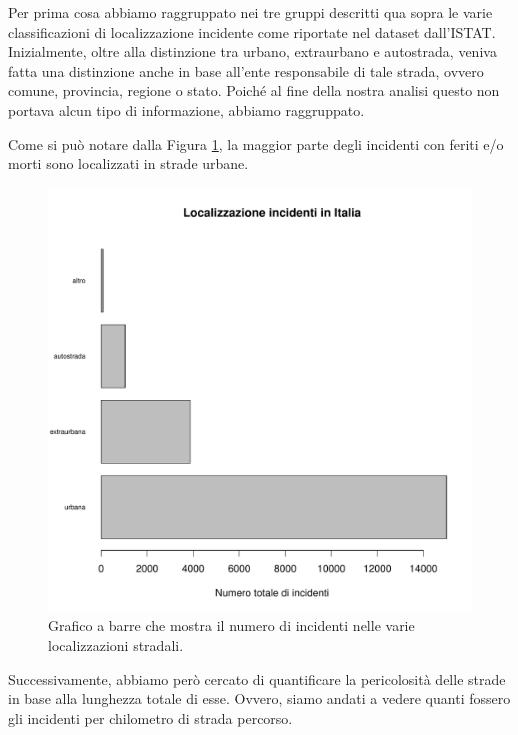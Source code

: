 \documentclass[12pt,a4paper,final,oneside]{article}			%
\begin{document}
        Per prima cosa abbiamo raggruppato nei tre gruppi descritti qua sopra le varie classificazioni di localizzazione incidente come riportate nel dataset dall'ISTAT.
        Inizialmente, oltre alla distinzione tra urbano, extraurbano e autostrada, veniva fatta una distinzione anche in base all'ente responsabile di tale strada, ovvero comune, provincia, regione o stato. Poiché al fine della nostra analisi questo non portava alcun tipo di informazione, abbiamo raggruppato.
        
        Come si può notare dalla Figura \ref{Fig: localizzazione_incidenti}, la maggior parte degli incidenti con feriti e/o morti sono localizzati in strade urbane.
        \begin{figure}[h]
            \centering
            \includegraphics[scale=0.55]{../results/localizzazione_incidenti.pdf}
            \caption{Grafico a barre che mostra il numero di incidenti nelle varie localizzazioni stradali. }
            \label{Fig: localizzazione_incidenti}
        \end{figure}
        
        Successivamente, abbiamo però cercato di quantificare la pericolosità delle strade in base alla lunghezza totale di esse. Ovvero, siamo andati a vedere quanti fossero gli incidenti per chilometro di strada percorso. 
        
\end{document}
